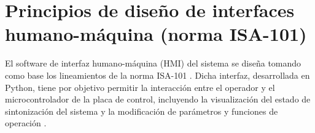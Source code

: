 
\section{Principios de dise\~no de interfaces humano-m\'aquina (norma ISA-101)}
\label{sec:isa101}

El software de interfaz humano-m\'aquina (HMI) del sistema se dise\~na
tomando como base los lineamientos de la norma ISA-101
\cite{informeAbril2026}. Dicha interfaz, desarrollada en Python, tiene
por objetivo permitir la interacci\'on entre el operador y el
microcontrolador de la placa de control, incluyendo la visualizaci\'on
del estado de sintonizaci\'on del sistema y la modificaci\'on de
par\'ametros y funciones de operaci\'on \cite{sat2026,informeAbril2026}.

